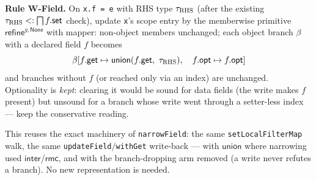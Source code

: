 \documentclass[11pt]{article}
\newcommand{\refineop}{\mathsf{refine}}
\begin{document}
\begin{keydef}
\textbf{Rule W-Field.} On \texttt{x.f = e} with RHS type $\tau_{\rm RHS}$
(after the existing $\tau_{\rm RHS} <: \bigsqcap f.\mathsf{set}$ check),
update \texttt{x}'s scope entry by the memberwise primitive
$\refineop^{g,\mathsf{None}}$ with mapper: non-object members unchanged;
each object branch $\beta$ with a declared field $f$ becomes
\[
\beta[f.\mathsf{get} \mapsto
  \mathsf{union}(f.\mathsf{get},\ \tau_{\rm RHS}),\quad
  f.\mathsf{opt} \mapsto f.\mathsf{opt}]
\]
and branches without $f$ (or reached only via an index) are unchanged.
Optionality is \emph{kept}: clearing it would be sound for data fields
(the write makes $f$ present) but unsound for a branch whose write went
through a setter-less index — keep the conservative reading.
\end{keydef}

This reuses the exact machinery of \texttt{narrowField}: the same
\texttt{setLocalFilterMap} walk, the same
\texttt{updateField}$/$\texttt{withGet} write-back — with
$\mathsf{union}$ where narrowing used $\mathsf{inter}$/$\mathsf{rmc}$,
and with the branch-dropping arm removed (a write never refutes a
branch). No new representation is needed.
\end{document}

